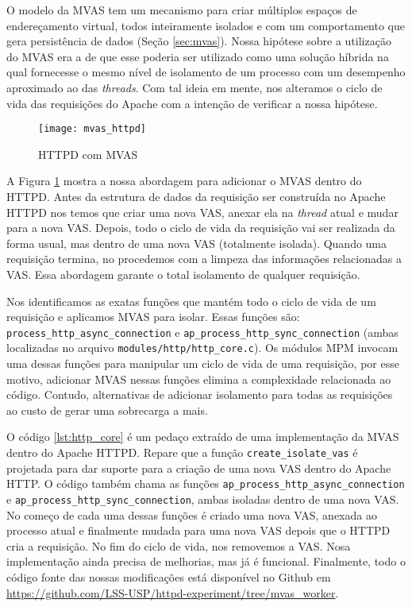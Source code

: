O modelo da MVAS tem um mecanismo para criar múltiplos espaços de endereçamento
virtual, todos inteiramente isolados e com um comportamento que gera
persistência de dados (Seção \ref{sec:mvas}). Nossa hipótese sobre a utilização
do MVAS era a de que esse poderia ser utilizado como uma solução híbrida na
qual fornecesse o mesmo nível de isolamento de um processo com um desempenho
aproximado ao das \emph{threads}. Com tal ideia em mente, nos alteramos o ciclo
de vida das requisições do Apache com a intenção de verificar a nossa hipótese.

\begin{figure}[!h]
  \centering
  \texttt{[image: mvas\_httpd]} 
  \caption{HTTPD com MVAS}
  \label{fig:httpd_mvas} 
\end{figure}

A Figura \ref{fig:httpd_mvas} mostra a nossa abordagem para adicionar o MVAS
dentro do HTTPD. Antes da estrutura de dados da requisição ser construída no
Apache HTTPD nos temos que criar uma nova VAS, anexar ela na \emph{thread}
atual e mudar para a nova VAS. Depois, todo o ciclo de vida da requisição vai
ser realizada da forma usual, mas dentro de uma nova VAS (totalmente isolada).
Quando uma requisição termina, no procedemos com a limpeza das informações
relacionadas a VAS. Essa abordagem garante o total isolamento de qualquer
requisição.

Nos identificamos as exatas funções que mantém todo o ciclo de vida de um
requisição e aplicamos MVAS para isolar. Essas funções são:
\texttt{process\_http\_async\_connection} e
\texttt{ap\_process\_http\_sync\_connection} (ambas localizadas no arquivo
\texttt{modules/http/http\_core.c}). Os módulos MPM invocam uma dessas funções
para manipular um ciclo de vida de uma requisição, por esse motivo, adicionar
MVAS nessas funções elimina a complexidade relacionada ao código. Contudo,
alternativas de adicionar isolamento para todas as requisições ao custo de
gerar uma sobrecarga a mais.

O código \ref{lst:http_core} é um pedaço extraído de uma implementação da MVAS
dentro do Apache HTTPD. Repare que a função \texttt{create\_isolate\_vas} é
projetada para dar suporte para a criação de uma nova VAS dentro do Apache
HTTP. O código também chama as funções
\texttt{ap\_process\_http\_async\_connection} e
\texttt{ap\_process\_http\_sync\_connection}, ambas isoladas dentro de uma nova
VAS. No começo de cada uma dessas funções é criado uma nova VAS, anexada ao
processo atual e finalmente mudada para uma nova VAS depois que o HTTPD cria a
requisição. No fim do ciclo de vida, nos removemos a VAS. Nosa implementação
ainda precisa de melhorias, mas já é funcional. Finalmente, todo o código fonte
das nossas modificações está disponível no Github em
\url{https://github.com/LSS-USP/httpd-experiment/tree/mvas\_worker}.

